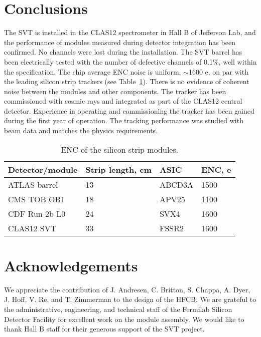 \section{Conclusions}

The SVT is installed in the CLAS12 spectrometer in Hall B of Jefferson Lab, and the performance of modules measured during detector integration has been confirmed. No channels were lost during the installation. The SVT barrel has been electrically  tested with the number of defective channels of 0.1$\%$, well within the specification. The chip average ENC noise is uniform, $\sim$1600 e, on par with the leading silicon strip trackers (see Table~\ref{tab:enc-table}). There is no evidence of coherent noise between the modules and other components. The tracker has been commissioned with cosmic rays and integrated as part of the CLAS12 central detector. Experience in operating and commissioning the tracker has been gained during the first year of operation. The tracking performance was studied with beam data and matches the physics requirements. 

\begin{table}[]
\begin{tabular}{llll}
\hline
Detector/module      & Strip length, cm & ASIC         & ENC, e\\ \hline
ATLAS barrel           & 13                      & ABCD3A    & 1500  \\
CMS TOB OB1        & 18                      & APV25       & 1100  \\
CDF Run 2b L0        & 24                     & SVX4         & 1600  \\
CLAS12 SVT            & 33                     & FSSR2       & 1600 \\ \hline
\end{tabular}
\caption{ENC of the silicon strip modules.}
\label{tab:enc-table}
\end{table}

\section{Acknowledgements}

We appreciate the contribution of J.  Andresen, C. Britton, S. Chappa, A. Dyer, J. Hoff, V. Re, and T. Zimmerman to the design of the HFCB. We are grateful to the administrative, engineering, and technical staff of the Fermilab Silicon Detector Facility for excellent work on the module assembly. We would like to thank Hall B staff for their generous support of the SVT project.



